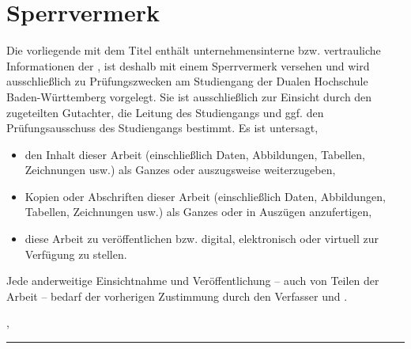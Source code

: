 \chapter*{Sperrvermerk}

\vspace*{2em}

Die vorliegende {\myArbeit} mit dem Titel {\itshape{} \myTitel{}\/}
enthält unternehmensinterne bzw. vertrauliche Informationen der {\myFirma},
ist deshalb mit einem Sperrvermerk versehen
und wird ausschließlich zu Prüfungszwecken am Studiengang
{\myDegree} der Dualen Hochschule Baden-Württemberg vorgelegt.
Sie ist ausschließlich zur Einsicht durch den zugeteilten Gutachter,
die Leitung des Studiengangs und ggf. den Prüfungsausschuss des Studiengangs
bestimmt.  Es ist untersagt,
\begin{itemize}
\item den Inhalt dieser Arbeit (einschließlich Daten, Abbildungen, Tabellen, Zeichnungen usw.) als Ganzes oder auszugsweise weiterzugeben,
\item Kopien oder Abschriften dieser Arbeit (einschließlich Daten, Abbildungen, Tabellen, Zeichnungen usw.) als Ganzes oder in Auszügen anzufertigen,
\item diese Arbeit zu veröffentlichen bzw. digital, elektronisch oder virtuell zur Verfügung zu stellen.
\end{itemize}
Jede anderweitige Einsichtnahme und Veröffentlichung – auch von Teilen der Arbeit – bedarf der vorherigen Zustimmung durch den Verfasser und {\myFirma}.

\vspace{3em}

\myAbgabeort, \myDatum
\vspace{4em}

\rule{6cm}{0.4pt}\\
\myAutor
